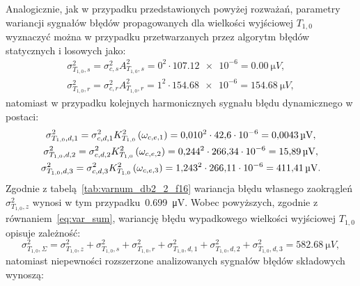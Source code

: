 Analogicznie, jak w przypadku przedstawionych powyżej rozważań, parametry wariancji sygnałów błędów propagowanych dla wielkości wyjściowej $T_{1,0}$ wyznaczyć można w przypadku przetwarzanych przez algorytm błędów statycznych i losowych jako:
\begin{gather}
\sigma_{T_{1,0},s}^{2} = \sigma_{c,s}^{2} A_{T_{1,0},s}^{2} = 0^{2} \cdot \num{107.12e-6} = \qty{0.00}{\micro V} \label{eq:sym_partd_output_var_stat_T_1_0}, \\
\sigma_{T_{1,0},r}^{2} = \sigma_{c,r}^{2} A_{T_{1,0},r}^{2} = 1^{2} \cdot \num{154.68e-6} = \qty{154.68}{\micro V} \label{eq:sym_partd_output_var_rand_T_1_0},
\end{gather}
natomiast w przypadku kolejnych harmonicznych sygnału błędu dynamicznego w postaci:
\begin{gather}
\sigma_{T_{1,0},d,1}^{2} = \sigma_{c,d,1}^{2} K_{T_{1,0}}^{2} \left(\omega_{c,e,1}\right) = \num{0.010}^{2} \cdot \num{42.6e-6} = \qty{0.0043}{\micro V} \label{eq:sym_partd_output_var_dyn_1_T_1_0}, \\
\sigma_{T_{1,0},d,2}^{2} = \sigma_{c,d,2}^{2} K_{T_{1,0}}^{2} \left(\omega_{c,e,2}\right) = \num{0.244}^{2} \cdot \num{266.34e-6} = \qty{15.89}{\micro V} \label{eq:sym_partd_output_var_dyn_2_T_1_0}, \\
\sigma_{T_{1,0},d,3}^{2} = \sigma_{c,d,3}^{2} K_{T_{1,0}}^{2} \left(\omega_{c,e,3}\right) = \num{1.243}^{2} \cdot \num{266.11e-6} = \qty{411.41}{\micro V} \label{eq:sym_partd_output_var_dyn_3_T_1_0}.
\end{gather}
Zgodnie z tabelą~\ref{tab:varnum_db2_2_f16} wariancja błędu własnego zaokrągleń $\sigma_{T_{1,0},z}^{2}$ wynosi w tym przypadku~\qty{0.699}{\micro V}. Wobec powyższych, zgodnie z równaniem~\eqref{eq:var_sum}, wariancję błędu wypadkowego wielkości wyjściowej $T_{1,0}$ opisuje zależność:
\begin{equation}
\sigma_{T_{1,0},\Sigma}^{2} = \sigma_{T_{1,0},z}^{2} + \sigma_{T_{1,0},s}^{2} + \sigma_{T_{1,0},r}^{2} + \sigma_{T_{1,0},d,1}^{2} + \sigma_{T_{1,0},d,2}^{2} + \sigma_{T_{1,0},d,3}^{2} = \qty{582.68}{\micro V} \label{eq:sym_partd_output_var_sum_T_1_0},
\end{equation}
natomiast niepewności rozszerzone analizowanych sygnałów błędów składowych wynoszą:
